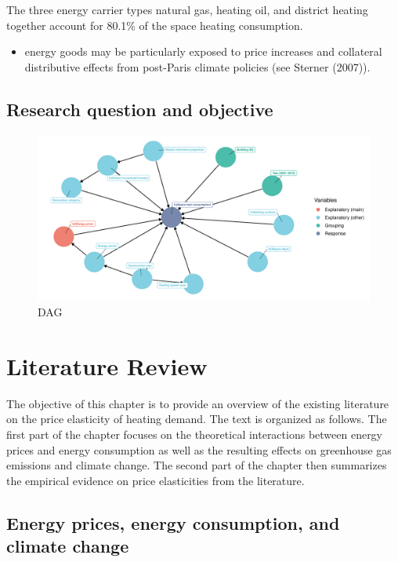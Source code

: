 \documentclass[12pt,twoside]{reedthesis}
\providecommand{\tightlist}{%
  \setlength{\itemsep}{0pt}\setlength{\parskip}{0pt}}
\begin{document}
The three energy carrier types natural gas, heating oil, and district heating together account for 80.1\% of the space heating consumption.
\begin{itemize}
\tightlist
\item
  energy goods may be particularly exposed to price increases and collateral distributive effects from post-Paris climate policies (see Sterner (2007)).
\end{itemize}
\hypertarget{question}{%
\section{Research question and objective}\label{question}}
\begin{figure}

{\centering \includegraphics[width=1\linewidth]{figure/conceptual_dag} 

}

\caption{DAG}\label{fig:dag}
\end{figure}
\hypertarget{literature}{%
\chapter{Literature Review}\label{literature}}

The objective of this chapter is to provide an overview of the existing literature on the price elasticity of heating demand. The text is organized as follows. The first part of the chapter focuses on the theoretical interactions between energy prices and energy consumption as well as the resulting effects on greenhouse gas emissions and climate change. The second part of the chapter then summarizes the empirical evidence on price elasticities from the literature.

\hypertarget{literature_intro}{%
\section{Energy prices, energy consumption, and climate change}\label{literature_intro}}
\end{document}

